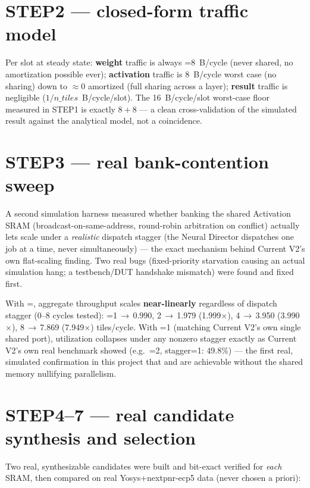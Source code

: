 \section{STEP2 --- closed-form traffic model}
Per slot at steady state: \textbf{weight} traffic is always
=8~B/cycle (never shared, no amortization possible ever);
\textbf{activation} traffic is 8~B/cycle worst case (no sharing) down
to $\approx$0 amortized (full sharing across a layer); \textbf{result}
traffic is negligible ($1/n\_tiles$~B/cycle/slot). The 16~B/cycle/slot
worst-case floor measured in STEP1 is exactly $8+8$ --- a clean
cross-validation of the simulated result against the analytical model,
not a coincidence.

\section{STEP3 --- real bank-contention sweep}
\label{sec:nmsstep3}
A second simulation harness measured whether banking the shared
Activation SRAM (broadcast-on-same-address, round-robin arbitration on
conflict) actually lets  scale under a \emph{realistic}
dispatch stagger (the Neural Director dispatches one job at a time,
never simultaneously) --- the exact mechanism behind Current V2's own
flat-scaling finding. Two real bugs (fixed-priority starvation causing
an actual simulation hang; a testbench/DUT handshake mismatch) were
found and fixed first.

\begin{fnnote}
With =, aggregate throughput scales
\textbf{near-linearly} regardless of dispatch stagger (0--8 cycles
tested): =1\,$\to$\,0.990, 2\,$\to$\,1.979 (1.999$\times$),
4\,$\to$\,3.950 (3.990$\times$), 8\,$\to$\,7.869 (7.949$\times$)
tiles/cycle. With =1 (matching Current V2's own single
shared port), utilization collapses under any nonzero stagger exactly
as Current V2's own real benchmark showed (e.g.\ =2,
stagger=1: 49.8\%) --- the first real, simulated confirmation in this
project that  and  are achievable without
the shared memory nullifying parallelism.
\end{fnnote}

\section{STEP4--7 --- real candidate synthesis and selection}
Two real, synthesizable candidates were built and bit-exact verified
for \emph{each} SRAM, then compared on real Yosys+nextpnr-ecp5 data
(never chosen a priori):

